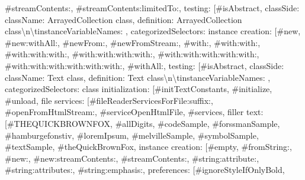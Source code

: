 {\textquotedbl{}\#streamContents:\textquotedbl{}, \textquotedbl{}\#streamContents:limitedTo:\textquotedbl{}{]}, \textquotedbl{}testing\textquotedbl{}: {[}\textquotedbl{}\#isAbstract\textquotedbl{}{]}\textbraceright \textbraceright \textbraceright , \textquotedbl{}classSide\textquotedbl{}: \textbraceleft \textquotedbl{}className\textquotedbl{}: \textquotedbl{}ArrayedCollection class\textquotedbl{}, \textquotedbl{}definition\textquotedbl{}: \textquotedbl{}ArrayedCollection class\allowbreak\textbackslash n\allowbreak\textbackslash tinstanceVariableNames: \textquotesingle{}\textquotesingle{}\textquotedbl{}, \textquotedbl{}categorizedSelectors\textquotedbl{}: \textbraceleft \textquotedbl{}instance creation\textquotedbl{}: {[}\textquotedbl{}\#new\textquotedbl{}, \textquotedbl{}\#new:withAll:\textquotedbl{}, \textquotedbl{}\#newFrom:\textquotedbl{}, \textquotedbl{}\#newFromStream:\textquotedbl{}, \textquotedbl{}\#with:\textquotedbl{}, \textquotedbl{}\#with:with:\textquotedbl{}, \textquotedbl{}\#with:with:with:\textquotedbl{}, \textquotedbl{}\#with:with:with:with:\textquotedbl{}, \textquotedbl{}\#with:with:with:with:with:\textquotedbl{}, \textquotedbl{}\#with:with:with:with:with:with:\textquotedbl{}, \textquotedbl{}\#withAll:\textquotedbl{}{]}, \textquotedbl{}testing\textquotedbl{}: {[}\textquotedbl{}\#isAbstract\textquotedbl{}{]}\textbraceright \textbraceright \textbraceright , \textquotedbl{}classSide\textquotedbl{}: \textbraceleft \textquotedbl{}className\textquotedbl{}: \textquotedbl{}Text class\textquotedbl{}, \textquotedbl{}definition\textquotedbl{}: \textquotedbl{}Text class\allowbreak\textbackslash n\allowbreak\textbackslash tinstanceVariableNames: \textquotesingle{}\textquotesingle{}\textquotedbl{}, \textquotedbl{}categorizedSelectors\textquotedbl{}: \textbraceleft \textquotedbl{}class initialization\textquotedbl{}: {[}\textquotedbl{}\#initTextConstants\textquotedbl{}, \textquotedbl{}\#initialize\textquotedbl{}, \textquotedbl{}\#unload\textquotedbl{}{]}, \textquotedbl{}file services\textquotedbl{}: {[}\textquotedbl{}\#fileReaderServicesForFile:suffix:\textquotedbl{}, \textquotedbl{}\#openFromHtmlStream:\textquotedbl{}, \textquotedbl{}\#serviceOpenHtmlFile\textquotedbl{}, \textquotedbl{}\#services\textquotedbl{}{]}, \textquotedbl{}filler text\textquotedbl{}: {[}\textquotedbl{}\#THEQUICKBROWNFOX\textquotedbl{}, \textquotedbl{}\#allDigits\textquotedbl{}, \textquotedbl{}\#codeSample\textquotedbl{}, \textquotedbl{}\#forssmanSample\textquotedbl{}, \textquotedbl{}\#hamburgefonstiv\textquotedbl{}, \textquotedbl{}\#loremIpsum\textquotedbl{}, \textquotedbl{}\#melvilleSample\textquotedbl{}, \textquotedbl{}\#symbolSample\textquotedbl{}, \textquotedbl{}\#textSample\textquotedbl{}, \textquotedbl{}\#theQuickBrownFox\textquotedbl{}{]}, \textquotedbl{}instance creation\textquotedbl{}: {[}\textquotedbl{}\#empty\textquotedbl{}, \textquotedbl{}\#fromString:\textquotedbl{}, \textquotedbl{}\#new:\textquotedbl{}, \textquotedbl{}\#new:streamContents:\textquotedbl{}, \textquotedbl{}\#streamContents:\textquotedbl{}, \textquotedbl{}\#string:attribute:\textquotedbl{}, \textquotedbl{}\#string:attributes:\textquotedbl{}, \textquotedbl{}\#string:emphasis:\textquotedbl{}{]}, \textquotedbl{}preferences\textquotedbl{}: {[}\textquotedbl{}\#ignoreStyleIfOnlyBold\textquotedbl{}, }
